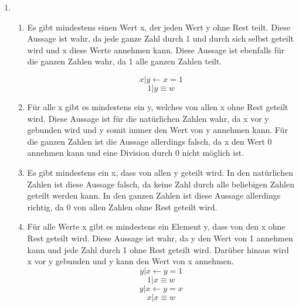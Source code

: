 \documentclass[a4paper]{article}
\begin{document}
	\begin{enumerate}
		\item
		\begin{enumerate}
			\item
			Es gibt mindestens einen Wert x, der jeden Wert y ohne Rest teilt.
			\newline
			Diese Aussage ist wahr, da jede ganze Zahl durch 1 und durch sich selbst geteilt wird und x diese Werte annehmen kann. Diese Aussage ist ebenfalls für die ganzen Zahlen wahr, da 1 alle ganzen Zahlen teilt.
			
			\begin{equation*}
				x | y \leftarrow x = 1
			\end{equation*}
			\begin{equation*}
				1 | y \equiv w
			\end{equation*}
			
			\item
			Für alle x gibt es mindestens ein y, welches von allen x ohne Rest geteilt wird.
			\newline
			Diese Aussage ist für die natürlichen Zahlen wahr, da x vor y gebunden wird und y somit immer den Wert von y annehmen kann. Für die ganzen Zahlen ist die Aussage allerdings falsch, da x den Wert 0 annehmen kann und eine Division durch 0 nicht möglich ist.
			
			\item
			Es gibt mindestens ein x, dass von allen y geteilt wird.
			\newline
			In den natürlichen Zahlen ist diese Aussage falsch, da keine Zahl durch alle beliebigen Zahlen geteilt werden kann. In den ganzen Zahlen ist diese Aussage allerdings richtig, da 0 von allen Zahlen ohne Rest geteilt wird.
			
			\item
			Für alle Werte x gibt es mindestens ein Element y, dass von den x ohne Rest geteilt wird.
			\newline
			Diese Aussage ist wahr, da y den Wert von 1 annehmen kann und jede Zahl durch 1 ohne Rest geteilt wird. Darüber hinaus wird x vor y gebunden und y kann den Wert von x annehmen.
			\begin{equation*}
				y | x \leftarrow y = 1
			\end{equation*}
			\begin{equation*}
				1 | x \equiv w
			\end{equation*}
			\begin{equation*}
				y | x \leftarrow y = x
			\end{equation*}
			\begin{equation*}
				x | x \equiv w
			\end{equation*}
		\end{enumerate}
		

\end{enumerate}
\end{document}
